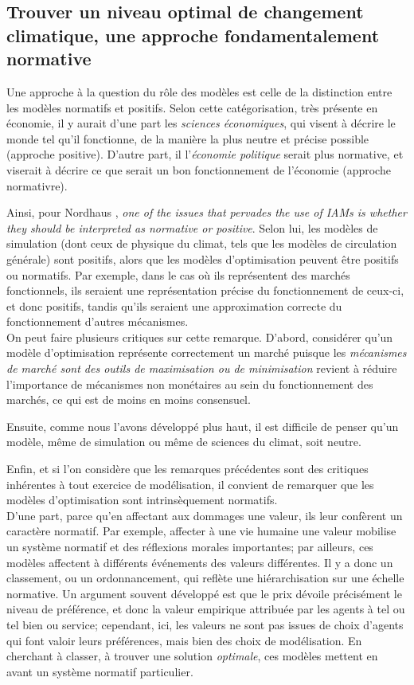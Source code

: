 \subsection{Trouver un niveau optimal de changement climatique, une approche fondamentalement normative}

Une approche à la question du rôle des modèles est celle de la distinction entre les modèles normatifs et positifs. Selon cette catégorisation, très présente en économie, il y aurait d'une part les \emph{sciences économiques}, qui visent à décrire le monde tel qu'il fonctionne, de la manière la plus neutre et précise possible (approche positive). D'autre part, il l'\emph{économie politique} serait plus normative, et viserait à décrire ce que serait un bon fonctionnement de l'économie (approche normativre). 

Ainsi, pour Nordhaus \cite{nordhaus_dice_2013}, \emph{one of the issues that pervades the use of IAMs is whether they should be interpreted as normative or positive}. Selon lui, les modèles de simulation (dont ceux de physique du climat, tels que les modèles de circulation générale) sont positifs, alors que les modèles d'optimisation peuvent être positifs ou normatifs. Par exemple, dans le cas où ils représentent des marchés fonctionnels, ils seraient une représentation précise du fonctionnement de ceux-ci, et donc positifs, tandis qu'ils seraient une approximation correcte du fonctionnement d'autres mécanismes. \\

On peut faire plusieurs critiques sur cette remarque. D'abord, considérer qu'un modèle d'optimisation représente correctement un marché puisque les \emph{mécanismes de marché sont des outils de maximisation ou de minimisation} revient à réduire l'importance de mécanismes non monétaires au sein du fonctionnement des marchés, ce qui est de moins en moins consensuel. 

Ensuite, comme nous l'avons développé plus haut, il est difficile de penser qu'un modèle, même de simulation ou même de sciences du climat, soit neutre. 

Enfin, et si l'on considère que les remarques précédentes sont des critiques inhérentes à tout exercice de modélisation, il convient de remarquer que les modèles d'optimisation sont intrinsèquement normatifs. \\

D'une part, parce qu'en affectant aux dommages une valeur, ils leur confèrent un caractère normatif. Par exemple, affecter à une vie humaine une valeur mobilise un système normatif et des réflexions morales importantes; par ailleurs, ces modèles affectent à différents événements des valeurs différentes. Il y a donc un classement, ou un ordonnancement, qui reflète une hiérarchisation sur une échelle normative. Un argument souvent développé est que le prix dévoile précisément le niveau de préférence, et donc la valeur empirique attribuée par les agents à tel ou tel bien ou service; cependant, ici, les valeurs ne sont pas issues de choix d'agents qui font valoir leurs préférences, mais bien des choix de modélisation. En cherchant à classer, à trouver une solution \emph{optimale}, ces modèles mettent en avant un système normatif particulier. 

